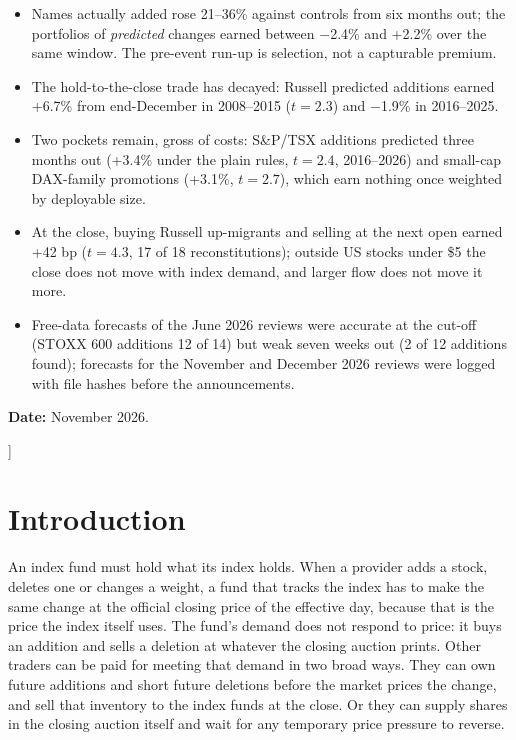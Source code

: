 \documentclass[10pt, a4paper, twocolumn]{article}
\newenvironment{keyfindings}
  {\begin{tcolorbox}[enhanced, colback=qbox, colframe=qnavy, boxrule=0pt, leftrule=2.5pt,
     arc=0pt, left=6pt, right=6pt, top=4pt, bottom=4pt, fontupper=\small,
     title={\small\bfseries Key findings}, coltitle=qnavy, colbacktitle=qbox, attach title to upper={\par\vspace{2pt}}]
   \begin{itemize}[nosep, leftmargin=*, label={\color{qnavy}\textbullet}]}
  {\end{itemize}\end{tcolorbox}}
\begin{document}
{\begin{center}
\vspace{0.5em}
\begin{minipage}{0.92\textwidth}
\begin{keyfindings}
\item Names actually added rose 21--36\% against controls from six months out; the portfolios of \emph{predicted} changes earned between $-$2.4\% and +2.2\% over the same window. The pre-event run-up is selection, not a capturable premium.
\item The hold-to-the-close trade has decayed: Russell predicted additions earned +6.7\% from end-December in 2008--2015 ($t = 2.3$) and $-$1.9\% in 2016--2025.
\item Two pockets remain, gross of costs: S\&P/TSX additions predicted three months out (+3.4\% under the plain rules, $t = 2.4$, 2016--2026) and small-cap DAX-family promotions (+3.1\%, $t = 2.7$), which earn nothing once weighted by deployable size.
\item At the close, buying Russell up-migrants and selling at the next open earned +42 bp ($t = 4.3$, 17 of 18 reconstitutions); outside US stocks under \$5 the close does not move with index demand, and larger flow does not move it more.
\item Free-data forecasts of the June 2026 reviews were accurate at the cut-off (STOXX 600 additions 12 of 14) but weak seven weeks out (2 of 12 additions found); forecasts for the November and December 2026 reviews were logged with file hashes before the announcements.
\end{keyfindings}
\end{minipage}

\vspace{0.3em}
{\footnotesize \textbf{Date:} November 2026.}
\end{center}
\vspace{1em}
}]

\section{Introduction}
\label{sec:intro}

An index fund must hold what its index holds. When a provider adds a stock, deletes one or changes a weight, a fund that tracks the index has to make the same change at the official closing price of the effective day, because that is the price the index itself uses. The fund's demand does not respond to price: it buys an addition and sells a deletion at whatever the closing auction prints. Other traders can be paid for meeting that demand in two broad ways. They can own future additions and short future deletions before the market prices the change, and sell that inventory to the index funds at the close. Or they can supply shares in the closing auction itself and wait for any temporary price pressure to reverse.
\end{document}

